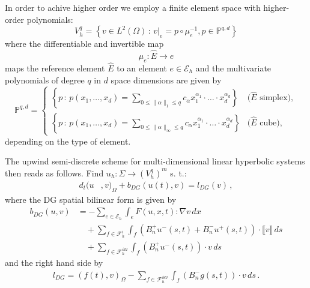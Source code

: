 \documentclass[a4paper,12pt]{article}
\theoremstyle{definition}
\theoremstyle{definition}
\begin{document}
In order to achive higher order we employ a finite element space with higher-order polynomials:
\begin{equation}
V_h^q = \left\{ v\in L^2(\Omega) \,:\, 
v|_e = p\circ\mu_e^{-1}, p\in\mathbb{P}^{q,d}\right\}
\end{equation}
where the differentiable and invertible map $$\mu_e : \hat{E} \to e$$
maps the reference element $\hat{E}$ to an element $e\in\mathcal{E}_h$ and the multivariate
polynomials of degree $q$ in $d$ space dimensions are given by
\begin{equation*}
\mathbb{P}^{q,d} = \left\{\begin{array}{ll}
\left\{ p\,:\, p(x_1,\ldots,x_d) = \sum\limits_{0\leq\|\alpha\|_1\leq q} c_\alpha
x_1^{\alpha_1}\cdot\ldots\cdot x_d^{\alpha_d}\right\} & \text{($\hat{E}$ simplex)}, \\
\left\{ p\,:\, p(x_1,\ldots,x_d) = \sum\limits_{0\leq\|\alpha\|_\infty\leq q} c_\alpha
x_1^{\alpha_1}\cdot\ldots\cdot x_d^{\alpha_d}\right\} & \text{($\hat{E}$ cube)},
\end{array}\right .
\end{equation*}
depending on the type of element.

The upwind semi-discrete scheme for multi-dimensional linear hyperbolic systems then reads
as follows. Find $u_h : \Sigma\to (V_h^q)^m$ s. t.:
\begin{equation}\label{eq:DG_identity}
\begin{split}
d_t (u&,v)_\Omega + b_{DG}(u(t),v) = l_{DG}(v) \,,
\end{split}
\end{equation}
where the DG spatial bilinear form is given by
\begin{equation}\label{eq:DG_blf}
\begin{split}
b_{DG}(u,v) &= -\sum_{e\in\mathcal{E}_h} \int_e F(u,x,t) : \nabla v\,dx\\
&\quad +\sum_{f\in\mathcal{F}_h^i} \int_f (B_n^+ u^-(s,t) + B_n^- u^+(s,t)) 
\cdot \llbracket  v \rrbracket \,ds\\
&\quad + \sum_{f\in\mathcal{F}_h^{\partial\Omega}} \int_f 
(B_n^+ u^-(s,t)) \cdot v \,ds
\end{split}
\end{equation}
and the right hand side by
\begin{equation}\label{eq:DG_rhs}
\begin{split}
l_{DG} =  (f(t),v)_\Omega - \sum_{f\in\mathcal{F}_h^{\partial\Omega}} \int_f 
(B_n^- g(s,t))\cdot v \,ds \, .
\end{split}
\end{equation}
\end{document}

